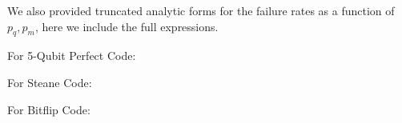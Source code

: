 \documentclass[superscriptaddress, notitlepage]{revtex4-1}
\begin{document}
We also provided truncated analytic forms for the failure rates as a function of $p_q, p_m$, here we include the full expressions.

For 5-Qubit Perfect Code:



For Steane Code:




For Bitflip Code:


\end{document}

